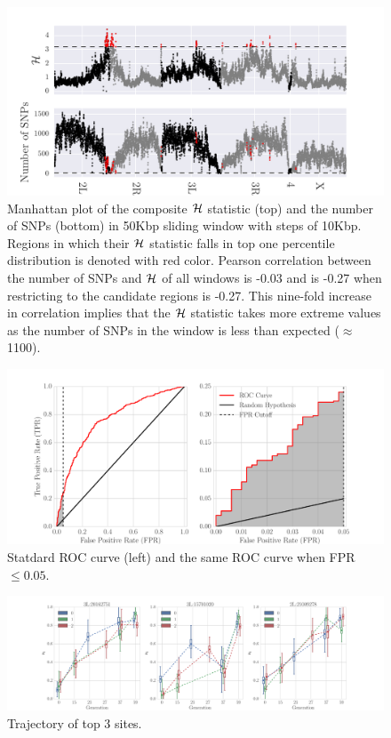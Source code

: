 \documentclass[11pt]{article}
\begin{document}
\begin{figure}[H]
	\centering
	\includegraphics[width=\textwidth]{figures/manhattan.pdf}
	\caption{Manhattan plot of the composite ${\cal H}$ statistic (top) 
	and the number of SNPs (bottom) in 50Kbp sliding window with steps of 
	10Kbp. Regions in which their ${\cal H}$ statistic falls in top one percentile 
	distribution is denoted with red color. Pearson correlation between the 
	number of SNPs and 
	${\cal H}$ of all windows is -0.03 and is -0.27 when restricting to the 
	candidate regions is -0.27. This 
	nine-fold increase in correlation implies that the ${\cal H}$ statistic takes 
	more extreme values as the number of SNPs in the window is less than 
	expected ($\approx$1100). } 
	\label{fig:manhattan}
\end{figure}


\begin{figure}[H]
	\centering
	\includegraphics[trim=0.4in 0 .8in 0.02in , 
	clip,width=\textwidth]{figures/powerROC.pdf}
	\caption{Statdard ROC curve (left) and the same ROC curve when FPR$\le 
		0.05$.} \label{fig:powerROC}
\end{figure}
\begin{figure}[H]
	\centering
	\includegraphics[width=\textwidth]{figures/trajectoryReal.pdf}
	\caption{Trajectory of top 3 sites.} 
	\label{fig:trajectoryReal}
\end{figure}
\end{document}
